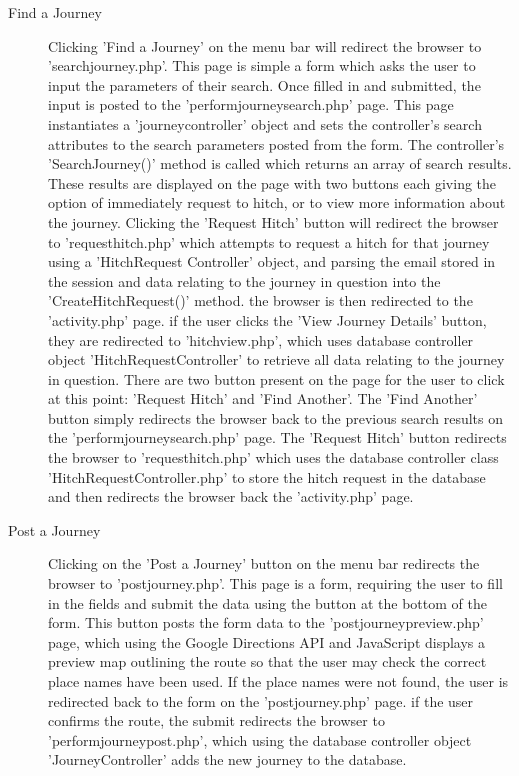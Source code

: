 \begin{description}
		\item[Find a Journey] Clicking 'Find a Journey' on the menu bar will redirect the browser to 'search\textunderscore journey.php'. This page is simple a form which asks the user to input the parameters of their search. Once filled in and submitted, the input is posted to the 'perform\textunderscore journey\textunderscore search.php' page. This page instantiates a 'journey\textunderscore controller' object and sets the controller's search attributes to the search parameters posted from the form. The controller's 'SearchJourney()' method is called which returns an array of search results. These results are displayed on the page with two buttons each giving the option of immediately request to hitch, or to view more information about the journey. Clicking the 'Request Hitch' button will redirect the browser to 'request\textunderscore hitch.php' which attempts to request a hitch for that journey using a 'Hitch\textunderscore Request \textunderscore Controller' object, and parsing the email stored in the session and data relating to the journey in question into the 'CreateHitchRequest()' method. the browser is then redirected to the 'activity.php' page. if the user clicks the 'View Journey Details' button, they are redirected to 'hitch\textunderscore view.php', which uses database controller object 'Hitch\textunderscore Request\textunderscore Controller' to retrieve all data relating to the journey in question. There are two button present on the page for the user to click at this point: 'Request Hitch' and 'Find Another'. The 'Find Another' button simply redirects the browser back to the previous search results on the 'perform\textunderscore journey\textunderscore search.php' page. The 'Request Hitch' button redirects the browser to 'request\textunderscore hitch.php' which uses the database controller class 'Hitch\textunderscore Request\textunderscore Controller.php' to store the hitch request in the database and then redirects the browser back the 'activity.php' page.

		\item[Post a Journey] Clicking on the 'Post a Journey' button on the menu bar redirects the browser to 'post\textunderscore journey.php'. This page is a form, requiring the user to fill in the fields and submit the data using the button at the bottom of the form. This button posts the form data to the 'post\textunderscore journey\textunderscore preview.php' page, which using the Google Directions API \cite{google_directions_api} and JavaScript displays a preview map outlining the route so that the user may check the correct place names have been used. If the place names were not found, the user is redirected back to the form on the 'post\textunderscore journey.php' page. if the user confirms the route, the submit redirects the browser to 'perform\textunderscore journey\textunderscore post.php', which using the database controller object 'Journey\textunderscore Controller' adds the new journey to the database.
		\end{description}
		
